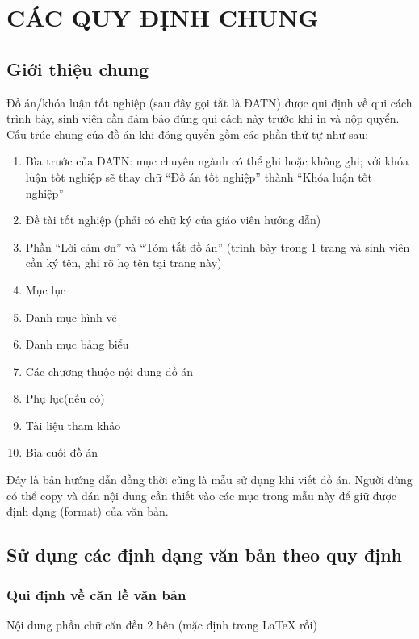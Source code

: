\chapter{CÁC QUY ĐỊNH CHUNG}
\label{chap:quydinh}



\section{Giới thiệu chung}
\label{sec:gtchung}
	\quad Đồ án/khóa luận tốt nghiệp (sau đây gọi tắt là ĐATN) được qui định về qui cách trình bày, sinh viên cần đảm bảo đúng qui cách này trước khi in và nộp quyển. Cấu trúc chung của đồ án khi đóng quyển gồm các phần thứ tự như sau:
\begin{enumerate}
	\item Bìa trước của ĐATN: mục chuyên ngành có thể ghi hoặc không ghi; với khóa luận tốt nghiệp sẽ thay chữ ``Đồ án tốt nghiệp'' thành ``Khóa luận tốt nghiệp''
	\item Đề tài tốt nghiệp (phải có chữ ký của giáo viên hướng dẫn)
	\item Phần ``Lời cảm ơn'' và ``Tóm tắt đồ án'' (trình bày trong 1 trang và sinh viên cần ký tên, ghi rõ họ tên tại trang này)
	\item Mục lục
	\item Danh mục hình vẽ
	\item Danh mục bảng biểu
	\item Các chương thuộc nội dung đồ án
	\item Phụ lục(nếu có)
 	\item Tài liệu tham khảo
	\item Bìa cuối đồ án
\end{enumerate}
Đây là bản hướng dẫn đồng thời cũng là mẫu sử dụng khi viết đồ án. Người dùng có thể copy và dán nội dung cần thiết vào các mục trong mẫu này để giữ được định dạng (format) của văn bản.



\section{Sử dụng các định dạng văn bản theo quy định}
\label{sec:dinhdang}

	\subsection{Qui định về căn lề văn bản}
	\label{ssec:canle}
Nội dung phần chữ căn đều 2 bên (mặc định trong \LaTeX{} rồi)	
	
